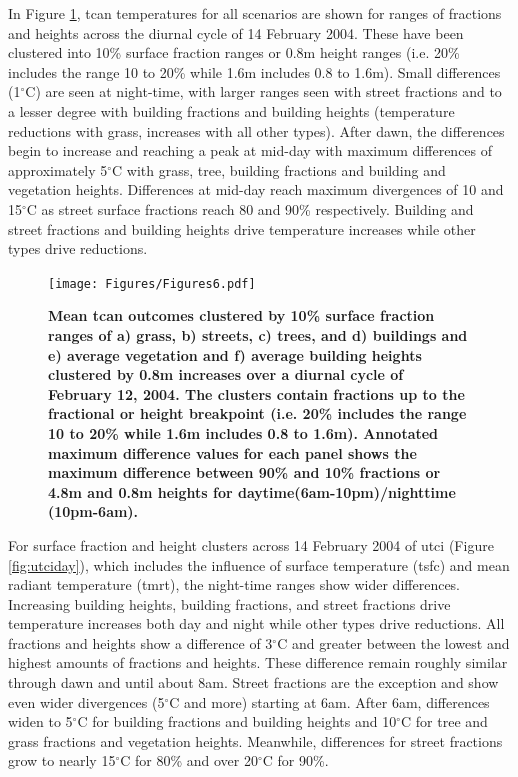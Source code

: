 \documentclass[final,3p,times,authoryear]{elsarticle}
\begin{document}
In Figure \ref{fig:tcanday}, \gls{tcan} temperatures for all scenarios are shown for ranges of fractions and heights across the diurnal cycle of 14 February 2004. These have been clustered into 10\% surface fraction ranges or 0.8m height ranges (i.e. 20\% includes the range 10 to 20\%  while 1.6m includes 0.8 to 1.6m). Small differences (1$^{\circ}$C) are seen at night-time, with larger ranges seen with street fractions and to a lesser degree with building fractions and building heights (temperature reductions with grass, increases with all other types). After dawn, the differences begin to increase and reaching a peak at mid-day with maximum differences of approximately 5$^{\circ}$C with grass, tree, building fractions and building and vegetation heights. Differences at mid-day reach maximum divergences of 10 and 15$^{\circ}$C as street surface fractions reach 80 and 90\% respectively. Building and street fractions and building heights drive temperature increases while other types drive reductions.

\begin{figure}
\centering
\texttt{[image: Figures/Figures6.pdf]}
\caption{\bf Mean \gls{tcan} outcomes clustered by 10\% surface fraction ranges of a) grass, b) streets, c) trees, and d) buildings and e) average vegetation and f) average building heights clustered by 0.8m increases over a diurnal cycle of February 12, 2004. The clusters contain fractions up to the fractional or height breakpoint (i.e. 20\% includes the range 10 to 20\%  while 1.6m includes 0.8 to 1.6m). Annotated maximum difference values for each panel shows the maximum difference between 90\% and 10\% fractions or 4.8m and 0.8m heights for daytime(6am-10pm)/nighttime (10pm-6am). }
 \label{fig:tcanday}
\end{figure}

For surface fraction and height clusters across 14 February 2004 of \gls{utci} (Figure \ref{fig:utciday}), which includes the influence of surface temperature (\gls{tsfc}) and mean radiant temperature (\gls{tmrt}), the night-time ranges show wider differences. Increasing building heights, building fractions, and street fractions drive temperature increases both day and night while other types drive reductions. All fractions and heights show a difference of 3$^{\circ}$C and greater between the lowest and highest amounts of fractions and heights. These difference remain roughly similar through dawn and until about 8am. Street fractions are the exception and show even wider divergences (5$^{\circ}$C and more) starting at 6am. After 6am, differences widen to 5$^{\circ}$C for building fractions and building heights and 10$^{\circ}$C for tree and grass fractions and vegetation heights. Meanwhile, differences for street fractions grow to nearly 15$^{\circ}$C for 80\% and over 20$^{\circ}$C for 90\%.
\end{document}
